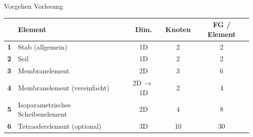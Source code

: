 \documentclass[aspectratio=169,professionalfonts]{beamer}
\begin{document}
\begin{frame}{Vorgehen Vorlesung}
  \centering\small
  \begin{tabular}{@{}clccc@{}}
    \toprule
    & \textbf{Element} & \textbf{Dim.} & \textbf{Knoten} & \textbf{FG / Element} \\
    \midrule
    \rowcolor{blue!15}\textbf{1} & Stab (allgemein)                      & 1D             & 2  & 2  \\[0.3em]
    \textbf{2} & Seil                                & 1D             & 2  & 2  \\[0.3em]
    \textbf{3} & Membranelement                      & 2D             & 3  & 6  \\[0.3em]
    \textbf{4} & Membranelement (vereinfacht)        & 2D\,$\to$\,1D  & 2  & 4  \\[0.3em]
    \textbf{5} & Isoparametrisches Scheibenelement   & 2D             & 4  & 8  \\[0.3em]
    \textbf{6} & Tetraederelement (optional)         & 3D             & 10 & 30 \\
    \bottomrule
  \end{tabular}
\end{frame}
\end{document}
